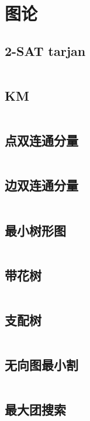 \section{图论}
\subsection{2-SAT tarjan}
\inputminted{cpp}{\source/graph-theory/2-sat-tarjan.cpp}
\subsection{KM}
\inputminted{cpp}{\source/graph-theory/KM.cpp}
\subsection{点双连通分量}
\inputminted{cpp}{\source/graph-theory/biconnected-graph-vertex.cpp}
\subsection{边双连通分量}
\inputminted{cpp}{\source/graph-theory/biconnected-graph-edge.cpp}
\subsection{最小树形图}
\inputminted{cpp}{\source/graph-theory/optimum-branching.cpp}
\subsection{带花树}
\inputminted{cpp}{\source/graph-theory/blossom-algorithm.cpp}
\subsection{支配树}
\inputminted{cpp}{\source/graph-theory/dominator-tree.cpp}
\subsection{无向图最小割}
\inputminted{cpp}{\source/graph-theory/stoer-wagner-algorithm.cpp}
\subsection{最大团搜索}
\inputminted{cpp}{\source/graph-theory/maxclique.cpp}
